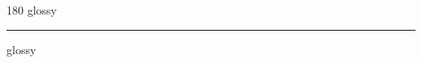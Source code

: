 
\begin{frame}
\begin{center}
\begin{turn}{180}
{\fontsize{2.5cm}{1em}\selectfont glossy}
\end{turn}
\vspace{1em}\par  
\hrule
\vspace{1em}\par  
{\fontsize{2.5cm}{1em}\selectfont glossy}
\end{center}
\end{frame}

